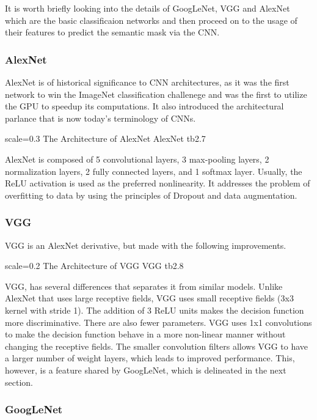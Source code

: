 It is worth briefly looking into the details of GoogLeNet, VGG and AlexNet which are the basic classificaion networks and then proceed on to the usage of their features to predict the semantic mask via the CNN. 

\subsubsection{AlexNet}
AlexNet is of historical significance to CNN architectures, as it was the first network to win the ImageNet classification challenege and was the first to utilize the GPU to speedup its computations. It also introduced the architectural parlance that is now today's terminology of CNNs. 

{scale=0.3}%
{The Architecture of AlexNet}%
{AlexNet}%
{tb2.7} %

AlexNet is composed of 5 convolutional layers, 3 max-pooling layers, 2 normalization layers, 2 fully connected layers, and 1 softmax layer. Usually, the ReLU activation is used as the preferred nonlinearity. It addresses the problem of overfitting to data by using the principles of Dropout and data augmentation. 

\subsubsection{VGG}

VGG is an AlexNet derivative, but made with the following improvements.

{scale=0.2}%
{The Architecture of VGG}%
{VGG}%
{tb2.8} %

VGG, has several differences that separates it from similar models. 
Unlike AlexNet that uses large receptive fields, VGG uses small receptive fields (3x3 kernel with stride 1). The addition of 3 ReLU units makes the decision function more discriminative. There are also fewer parameters. VGG uses 1x1 convolutions to make the decision function behave in a more non-linear manner without changing the receptive fields.
The smaller convolution filters allows VGG to have a larger number of weight layers, which leads to improved performance. This, however, is a feature shared by GoogLeNet, which is delineated in the next section. 

\subsubsection{GoogLeNet}


